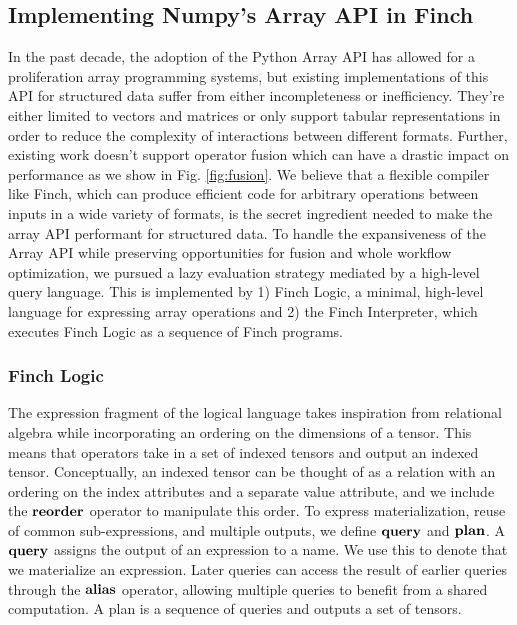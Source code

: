 \subsection{Implementing Numpy's Array API in Finch}
In the past decade, the adoption of the Python Array API \cite{harris_array_2020} has allowed for a proliferation array programming systems, but existing implementations of this API for structured data suffer from either incompleteness or inefficiency. They're either limited to vectors and matrices or only support tabular representations in order to reduce the complexity of interactions between different formats. Further, existing work doesn't support operator fusion which can have a drastic impact on performance as we show in Fig. \ref{fig:fusion}. We believe that a flexible compiler like Finch, which can produce efficient code for arbitrary operations between inputs in a wide variety of formats, is the secret ingredient needed to make the array API performant for structured data. To handle the expansiveness of the Array API while preserving opportunities for fusion and whole workflow optimization, we pursued a lazy evaluation strategy mediated by a high-level query language. This is implemented by 1) Finch Logic, a minimal, high-level language for expressing array operations and 2) the Finch Interpreter, which executes Finch Logic as a sequence of Finch programs.

\subsubsection{Finch Logic}
The expression fragment of the logical language takes inspiration from relational algebra while incorporating an ordering on the dimensions of a tensor. This means that operators take in a set of indexed tensors and output an indexed tensor. Conceptually, an indexed tensor can be thought of as a relation with an ordering on the index attributes and a separate value attribute, and we include the $\text{\textbf{reorder}}$ operator to manipulate this order. To express materialization, reuse of common sub-expressions, and multiple outputs, we define $\text{\textbf{query}}$ and $\text{\textbf{plan}}$. A $\text{\textbf{query}}$ assigns the output of an expression to a name. We use this to denote that we materialize an expression. Later queries can access the result of earlier queries through the $\text{\textbf{alias}}$ operator, allowing multiple queries to benefit from a shared computation. A plan is a sequence of queries and outputs a set of tensors. 

